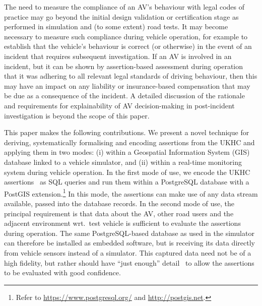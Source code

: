 The need to measure the compliance of an AV's behaviour with legal codes of practice may go beyond the initial design validation or certification stage as performed in simulation and (to some extent) road tests. It may become necessary to measure such compliance during vehicle operation, for example to establish that the vehicle's behaviour is correct (or otherwise) in the event of an incident that requires subsequent investigation. If an AV is involved in an incident, but it can be shown by assertion-based assessment during operation that it was adhering to all relevant legal standards of driving behaviour, then this may have an impact on any liability or insurance-based compensation that may be due as a consequence of the incident. A detailed discussion of the rationale and requirements for explainability of AV decision-making in post-incident investigation is beyond the scope of this paper.



This paper makes the following contributions. We present a novel technique for deriving, systematically formalising and encoding assertions from the UKHC and applying them in two modes: (i) within a Geospatial Information System (GIS) database linked to a vehicle simulator, and (ii) within a real-time monitoring system during vehicle operation.
%
In the first mode of use, we encode the UKHC assertions~\cite{highwayCode} as SQL queries and run them within a PostgreSQL database with a PostGIS extension.\footnote{Refer to \url{https://www.postgresql.org/} and \url{http://postgis.net}.} In this mode, the assertions can make use of any data stream available, passed into the database records.
%
In the second mode of use, the principal requirement is that data about the AV, other road users and the adjacent environment wrt.\ test vehicle is sufficient to evaluate the assertions during operation. The same PostgreSQL-based database as used in the simulator can therefore be installed as embedded software, but is receiving its data directly from vehicle sensors instead of a simulator. This captured data need not be of a high fidelity, but rather should have ``just enough'' detail~\cite{Koopman2018} to allow the assertions to be evaluated with good confidence.





